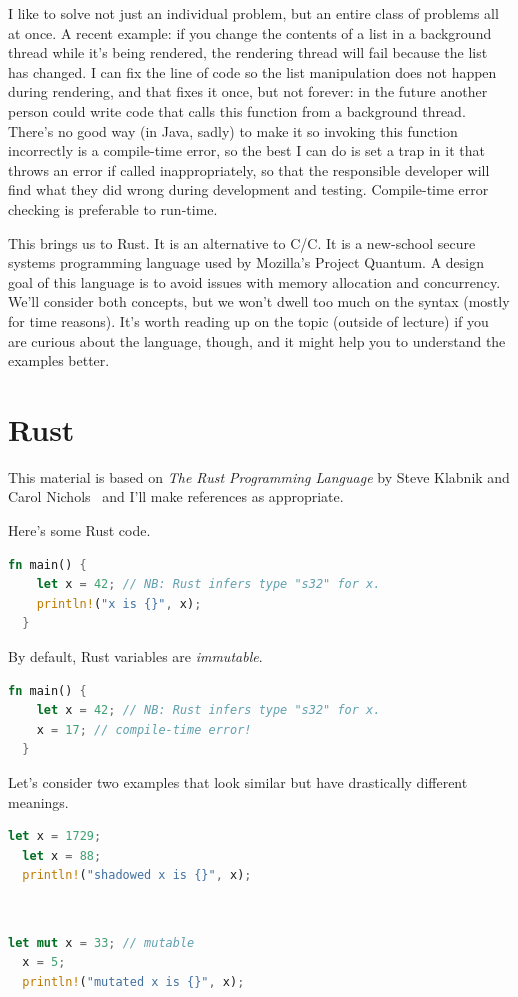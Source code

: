 \documentclass[a4paper]{report}
\newcommand{\CPP}{C\nolinebreak\hspace{-.05em}\raisebox{.4ex}{\tiny\bf +}\nolinebreak\hspace{-.10em}\raisebox{.4ex}{\tiny\bf +}}
\def\CPP{{C\nolinebreak[4]\hspace{-.05em}\raisebox{.4ex}{\tiny\bf ++}}}
\begin{document}
I like to solve not just an individual problem, but an entire class of problems all at once. A recent example: if you change the contents of a list in a background thread while it's being rendered, the rendering thread will fail because the list has changed. I can fix the line of code so the list manipulation does not happen during rendering, and that fixes it once, but not forever: in the future another person could write code that calls this function from a background thread. There's no good way (in Java, sadly) to make it so invoking this function incorrectly is a compile-time error, so the best I can do is set a trap in it that throws an error if called inappropriately, so that the responsible developer will find what they did wrong during development and testing. Compile-time error checking is preferable to run-time.

This brings us to Rust. It is an alternative to C/\CPP. It is a new-school
secure systems programming language used by Mozilla's Project Quantum. A design goal of this language is to avoid issues with memory allocation and concurrency. We'll consider both concepts, but we won't dwell too much on the syntax (mostly for time reasons). It's worth reading up on the topic (outside of lecture) if you are curious about the language, though, and it might help you to understand the examples better.  

\section*{Rust} This material is based
on \emph{The Rust Programming Language} by Steve Klabnik and Carol
Nichols~\cite{klabnik18:_rust_progr_languag} and I'll make references as appropriate.

Here's some Rust code.
\vspace*{-.5em}
\begin{lstlisting}[language=Rust]
  fn main() {
    let x = 42; // NB: Rust infers type "s32" for x.
    println!("x is {}", x);
  }
\end{lstlisting}
By default, Rust variables are \emph{immutable}.
\vspace*{-.5em}
\begin{lstlisting}[language=Rust]
  fn main() {
    let x = 42; // NB: Rust infers type "s32" for x.
    x = 17; // compile-time error!
  }
\end{lstlisting}
Let's consider two examples that look similar but have drastically different meanings.

\vspace*{-1.5em}
\begin{minipage}{.4\textwidth}
\begin{lstlisting}[language=Rust]
  let x = 1729;
  let x = 88;
  println!("shadowed x is {}", x);
\end{lstlisting}
\end{minipage}\
\begin{minipage}{.4\textwidth}
\begin{lstlisting}[language=Rust]
  let mut x = 33; // mutable
  x = 5;
  println!("mutated x is {}", x);
\end{lstlisting}
\end{minipage}
\end{document}
